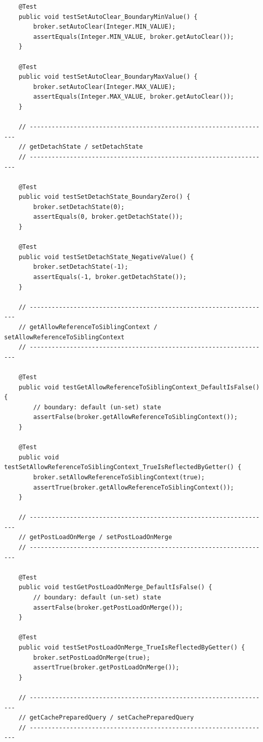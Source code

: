 \begin{lstlisting}
    @Test
    public void testSetAutoClear_BoundaryMinValue() {
        broker.setAutoClear(Integer.MIN_VALUE);
        assertEquals(Integer.MIN_VALUE, broker.getAutoClear());
    }

    @Test
    public void testSetAutoClear_BoundaryMaxValue() {
        broker.setAutoClear(Integer.MAX_VALUE);
        assertEquals(Integer.MAX_VALUE, broker.getAutoClear());
    }

    // ------------------------------------------------------------------
    // getDetachState / setDetachState
    // ------------------------------------------------------------------

    @Test
    public void testSetDetachState_BoundaryZero() {
        broker.setDetachState(0);
        assertEquals(0, broker.getDetachState());
    }

    @Test
    public void testSetDetachState_NegativeValue() {
        broker.setDetachState(-1);
        assertEquals(-1, broker.getDetachState());
    }

    // ------------------------------------------------------------------
    // getAllowReferenceToSiblingContext / setAllowReferenceToSiblingContext
    // ------------------------------------------------------------------

    @Test
    public void testGetAllowReferenceToSiblingContext_DefaultIsFalse() {
        // boundary: default (un-set) state
        assertFalse(broker.getAllowReferenceToSiblingContext());
    }

    @Test
    public void testSetAllowReferenceToSiblingContext_TrueIsReflectedByGetter() {
        broker.setAllowReferenceToSiblingContext(true);
        assertTrue(broker.getAllowReferenceToSiblingContext());
    }

    // ------------------------------------------------------------------
    // getPostLoadOnMerge / setPostLoadOnMerge
    // ------------------------------------------------------------------

    @Test
    public void testGetPostLoadOnMerge_DefaultIsFalse() {
        // boundary: default (un-set) state
        assertFalse(broker.getPostLoadOnMerge());
    }

    @Test
    public void testSetPostLoadOnMerge_TrueIsReflectedByGetter() {
        broker.setPostLoadOnMerge(true);
        assertTrue(broker.getPostLoadOnMerge());
    }

    // ------------------------------------------------------------------
    // getCachePreparedQuery / setCachePreparedQuery
    // ------------------------------------------------------------------


\end{lstlisting}
